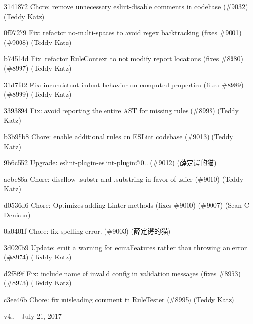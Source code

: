 \begin{DoxyItemize}
\item 3141872 Chore\+: remove unnecessary eslint-\/disable comments in codebase (\#9032) (Teddy Katz)
\item 0f97279 Fix\+: refactor no-\/multi-\/spaces to avoid regex backtracking (fixes \#9001) (\#9008) (Teddy Katz)
\item b74514d Fix\+: refactor Rule\+Context to not modify report locations (fixes \#8980) (\#8997) (Teddy Katz)
\item 31d7fd2 Fix\+: inconsistent {\ttfamily indent} behavior on computed properties (fixes \#8989) (\#8999) (Teddy Katz)
\item 3393894 Fix\+: avoid reporting the entire A\+ST for missing rules (\#8998) (Teddy Katz)
\item b3b95b8 Chore\+: enable additional rules on E\+S\+Lint codebase (\#9013) (Teddy Katz)
\item 9b6c552 Upgrade\+: eslint-\/plugin-\/eslint-\/plugin@0.. (\#9012) (薛定谔的猫)
\item acbe86a Chore\+: disallow .substr and .substring in favor of .slice (\#9010) (Teddy Katz)
\item d0536d6 Chore\+: Optimizes adding Linter methods (fixes \#9000) (\#9007) (Sean C Denison)
\item 0a0401f Chore\+: fix spelling error. (\#9003) (薛定谔的猫)
\item 3d020b9 Update\+: emit a warning for ecma\+Features rather than throwing an error (\#8974) (Teddy Katz)
\item d2f8f9f Fix\+: include name of invalid config in validation messages (fixes \#8963) (\#8973) (Teddy Katz)
\item c3ee46b Chore\+: fix misleading comment in Rule\+Tester (\#8995) (Teddy Katz)
\end{DoxyItemize}

v4.. -\/ July 21, 2017


